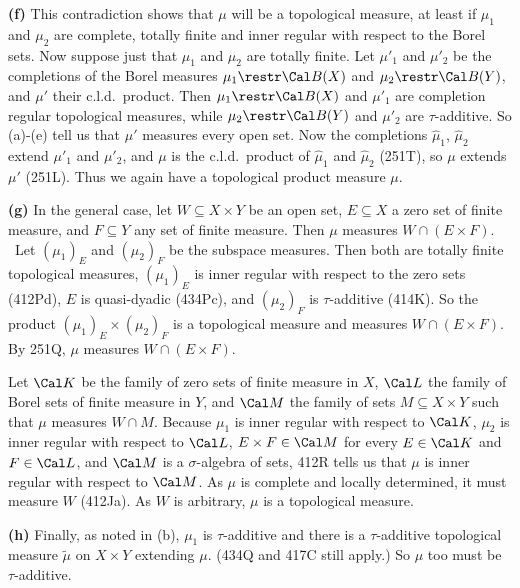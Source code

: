 {\medskip

{\bf (f)} This contradiction shows that $\mu$ will be a topological
measure, at least if $\mu_1$ and $\mu_2$ are complete, totally finite
and inner regular
with respect to the Borel sets.   Now suppose just that $\mu_1$ and
$\mu_2$ are totally finite.   Let $\mu'_1$ and $\mu'_2$ be the completions
of the Borel measures $\mu_1\restr\Cal B(X)$ and $\mu_2\restr\Cal B(Y)$,
and $\mu'$ their c.l.d.\
product.   Then $\mu_1\restr\Cal B(X)$ and $\mu'_1$ are
completion regular topological measures, while $\mu_2\restr\Cal B(Y)$ and
$\mu'_2$ are $\tau$-additive.   So (a)-(e) tell us that $\mu'$ measures
every open set.   Now the completions $\hat\mu_1$, $\hat\mu_2$ extend
$\mu'_1$ and $\mu'_2$, and $\mu$ is the c.l.d.\ product of $\hat\mu_1$ and
$\hat\mu_2$ (251T), so $\mu$ extends $\mu'$
(251L).   Thus we again have a topological product measure $\mu$.

\medskip

{\bf (g)} In the general case, let $W\subseteq X\times Y$ be an open set,
$E\subseteq X$ a zero set of finite measure, and $F\subseteq Y$ any set of
finite measure.   Then $\mu$ measures $W\cap(E\times F)$.   \Prf\ Let
$(\mu_1)_E$ and $(\mu_2)_F$ be the subspace measures.   Then both are
totally finite topological measures, $(\mu_1)_E$ is inner regular with
respect to the zero sets (412Pd), $E$ is
quasi-dyadic (434Pc), and $(\mu_2)_F$ is $\tau$-additive (414K).   So
the product $(\mu_1)_E\times(\mu_2)_F$ is a topological measure and
measures $W\cap(E\times F)$.    By 251Q, $\mu$ measures
$W\cap(E\times F)$.\ \Qed

Let $\Cal K$ be the family of zero sets of finite measure in $X$, $\Cal L$
the family of Borel sets of finite measure in $Y$, and $\Cal M$ the family
of sets $M\subseteq X\times Y$ such that $\mu$ measures $W\cap M$.
Because $\mu_1$ is inner regular with respect to $\Cal K$,
$\mu_2$ is inner regular with respect to $\Cal L$,
$E\times F\in\Cal M$ for every $E\in\Cal K$ and $F\in\Cal L$, and
$\Cal M$ is a $\sigma$-algebra of sets, 412R tells us
that $\mu$ is inner regular with respect to $\Cal M$.   As $\mu$ is
complete and locally determined, it must measure $W$ (412Ja).   As $W$ is
arbitrary, $\mu$ is a topological measure.

\medskip

{\bf (h)} Finally, as noted in (b), $\mu_1$ is $\tau$-additive and
there is a $\tau$-additive topological measure $\tilde\mu$ on $X\times Y$
extending $\mu$.   (434Q and 417C still apply.)
So $\mu$ too must be $\tau$-additive.
}%

